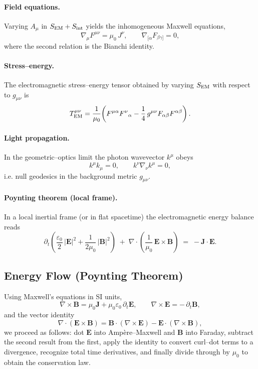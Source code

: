 \paragraph{Field equations.}
Varying \(A_\mu\) in \(S_{\rm EM}+S_{\rm int}\) yields the inhomogeneous Maxwell equations,
\begin{equation}
\nabla_\mu F^{\mu\nu}=\mu_0\,J^\nu, \qquad \nabla_{[\alpha}F_{\beta\gamma]}=0,
\end{equation}
where the second relation is the Bianchi identity.

\paragraph{Stress--energy.}
The electromagnetic stress--energy tensor obtained by varying \(S_{\rm EM}\) with respect to \(g_{\mu\nu}\) is
\begin{equation}
T^{\mu\nu}_{\rm EM}=\frac{1}{\mu_0}\!\left(F^{\mu\alpha}F^{\nu}{}_{\alpha}-\frac{1}{4}\,g^{\mu\nu}F_{\alpha\beta}F^{\alpha\beta}\right).
\end{equation}

\paragraph{Light propagation.}
In the geometric–optics limit the photon wavevector \(k^\mu\) obeys
\begin{equation}
k^\mu k_\mu=0, \qquad k^\nu\nabla_\nu k^\mu=0,
\end{equation}
i.e. null geodesics in the background metric \(g_{\mu\nu}\).

\paragraph{Poynting theorem (local frame).}
In a local inertial frame (or in flat spacetime) the electromagnetic energy balance reads
\begin{equation}
\partial_t\!\left(\frac{\varepsilon_0}{2}\,|\mathbf{E}|^2+\frac{1}{2\mu_0}\,|\mathbf{B}|^2\right)
\;+\;\nabla\!\cdot\!\left(\frac{1}{\mu_0}\,\mathbf{E}\times\mathbf{B}\right)
\;=\;-\mathbf{J}\!\cdot\!\mathbf{E}.
\end{equation}

\subsection{Energy Flow (Poynting Theorem)}
Using Maxwell's equations in SI units,
\[
\nabla \times \mathbf{B}=\mu_{0}\mathbf{J}+\mu_{0}\varepsilon_{0}\,\partial_{t}\mathbf{E},
\qquad
\nabla \times \mathbf{E}=-\,\partial_{t}\mathbf{B},
\]
and the vector identity
\[
\nabla\!\cdot(\mathbf{E}\times\mathbf{B})
=\mathbf{B}\!\cdot(\nabla\times\mathbf{E})-\mathbf{E}\!\cdot(\nabla\times\mathbf{B}),
\]
we proceed as follows: dot $\mathbf{E}$ into Amp\`ere–Maxwell and $\mathbf{B}$ into Faraday, subtract the second result from the first, apply the identity to convert curl–dot terms to a divergence, recognize total time derivatives, and finally divide through by $\mu_{0}$ to obtain the conservation law.

